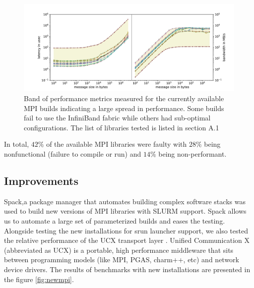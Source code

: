 \documentclass[manuscript,screen]{acmart}
\begin{document}
\begin{figure}
	\hspace*{-1.5cm}\includegraphics[scale=0.6]{curr_pearc}
	\caption{Band of performance metrics measured for the currently
			 available MPI builds indicating a large spread in 
			 performance. Some builds fail to use the InfiniBand fabric while others had sub-optimal configurations. The list of libraries tested is listed in section A.1}
	\label{fig:currmpi}
\end{figure}

In total, $42\%$ of the available MPI libraries were faulty with $28\%$ being nonfunctional (failure to compile or run) and $14\%$ being non-performant.

\subsection{Improvements}
 
Spack\cite{spack},a package manager that automates building complex software stacks was used to build new versions of MPI libraries with SLURM support. Spack allows us to automate a large set of parameterized builds and eases the testing. Alongside testing the new installations for srun launcher support, we also tested the relative performance of the UCX transport layer \cite{shamis2015ucx,openucx-website}. Unified Communication X (abbreviated as UCX) is a portable, high performance middleware that sits between programming models (like MPI, PGAS, charm++, etc) and network device drivers. The results of benchmarks with new installations are presented in the figure \ref{fig:newmpi}. 
\end{document}
